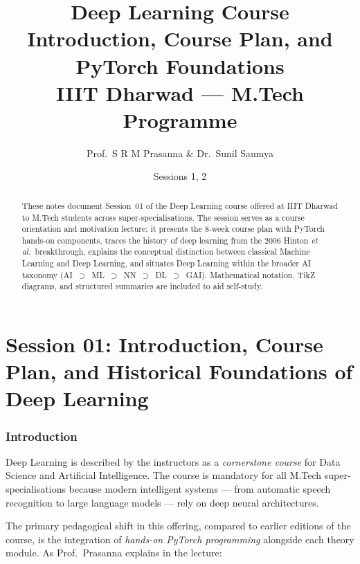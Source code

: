 \documentclass[12pt,a4paper]{article}
\title{%
  {\Large\bfseries Deep Learning Course}\\[6pt]
  {\LARGE Introduction, Course Plan, and PyTorch Foundations}\\[4pt]
  {\normalsize IIIT Dharwad --- M.Tech Programme}
}
\author{Prof.\ S R M Prasanna \& Dr.\ Sunil Saumya}
\date{Sessions 1, 2}
\begin{document}
\maketitle
\tableofcontents
\clearpage

\part{Session 01: Introduction, Course Plan, and Historical Foundations of Deep Learning}


\begin{abstract}
These notes document Session~01 of the Deep Learning course offered at
IIIT Dharwad to M.Tech students across super-specialisations.  The session
serves as a course orientation and motivation lecture: it presents the
8-week course plan with PyTorch hands-on components, traces the history of
deep learning from the 2006 Hinton \emph{et al.}\ breakthrough, explains the
conceptual distinction between classical Machine Learning and Deep Learning,
and situates Deep Learning within the broader AI taxonomy
(AI~$\supset$~ML~$\supset$~NN~$\supset$~DL~$\supset$~GAI).  Mathematical
notation, TikZ diagrams, and structured summaries are included to aid
self-study.
\end{abstract}

\newpage

\section{Introduction}
\label{sec:intro}

Deep Learning is described by the instructors as a \emph{cornerstone course}
for Data Science and Artificial Intelligence.  The course is mandatory for all
M.Tech super-specialisations because modern intelligent systems — from
automatic speech recognition to large language models — rely on deep neural
architectures.

The primary pedagogical shift in this offering, compared to earlier editions of
the course, is the integration of \emph{hands-on PyTorch programming} alongside
each theory module.  As Prof.\ Prasanna explains in the lecture:
\end{document}

